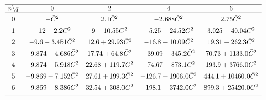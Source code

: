 \documentclass[12pt,a5paper]{article}
\begin{document}
\begin{table}
\caption{The coefficients of the partial sums $\sum_{p=0}^{n}\gamma^p\grave{\kappa}^q$ in the 
asymptotic expansion of $\Re\bar{\lambda}$ about $\grave{\kappa}=\pi-\kappa=0$ 
for leading values of $n$ and $q$, up to ${\cal O}(\gamma^{n+1},\bar{C}^3)$.
 The special case of $q=0$ gives the stability of the sawtooth mode.}
\label{tab:partial:kappa:pi}
\centering\footnotesize
\[
\begin{array}{ccccc}
\hline
n\backslash q & 0 & 2 & 4 & 6\\ %
\hline
&&&&\\[-2ex]
0 & -\bar{C}^2 & 2.1\bar{C}^2 & -2.688\bar{C}^2
 & 2.75\bar{C}^2
\\[1ex]
1 & -12-2.2\bar{C}^2 
  & 9+10.55\bar{C}^2
  & -5.25-24.52\bar{C}^2
  & 3.025+40.04\bar{C}^2
\\[1ex]
2  & -9.6-3.451\bar{C}^2
 & 12.6+29.93\bar{C}^2
 & -16.8-10.09\bar{C}^2
 & 19.31+262.3\bar{C}^2
\\[1ex]
3 & -9.874-4.686\bar{C}^2
 & 17.74+64.8\bar{C}^2
 & -39.09-345.2\bar{C}^2
 & 70.73+1133.0\bar{C}^2
\\[1ex]
4 & -9.874-5.918\bar{C}^2
  & 22.68+119.7\bar{C}^2
  & -74.67-873.1\bar{C}^2
  & 193.9+3766.0\bar{C}^2
\\[1ex]
5 & -9.869-7.152\bar{C}^2
 & 27.61+199.3\bar{C}^2
 & -126.7-1906.0\bar{C}^2
 & 444.1+10460.0\bar{C}^2
\\[1ex]
6 & -9.869-8.386\bar{C}^2
  & 32.54+308.0\bar{C}^2
  & -198.1-3742.0\bar{C}^2
  & 899.3+25420.0\bar{C}^2
\\[1ex]
\hline
\end{array}
\]
\end{table}
\end{document}
